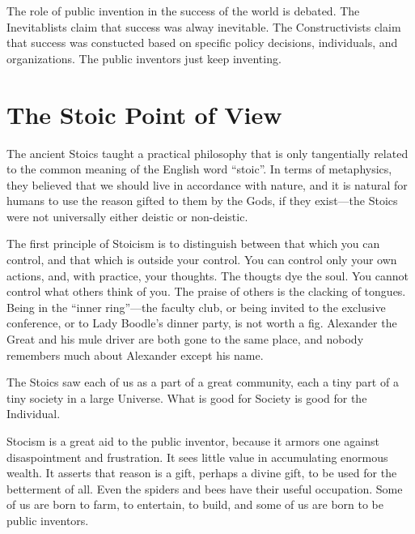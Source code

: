 \documentclass[
	fontsize=10pt, %
	twoside=false, %
	secnumdepth=1, %
]{kaobook}
\begin{document}
The role of public invention in the success of the world is
debated. The Inevitablists claim that success was alway inevitable.
The Constructivists claim that success was constucted based on
specific policy decisions, individuals, and organizations.
The public inventors just keep inventing.

\chapter{The Stoic Point of View}

The ancient Stoics taught a practical philosophy that is only
tangentially related to the common meaning of the English word ``stoic''.
In terms of metaphysics, they believed that we should live in
accordance with nature, and it is natural for humans to use the reason
gifted to them by the Gods, if they exist---the Stoics were not
universally either deistic or non-deistic.

The first principle of Stoicism
is to distinguish between that which you can control, and that which
is outside your control.  You can control only your own actions, and,
with practice, your thoughts. The thougts dye the soul.  You cannot
control what others think of you.  The praise of others is the clacking
of tongues.  Being in the ``inner ring''---the faculty club, or being
invited to the exclusive conference, or to Lady Boodle's dinner party,
is not worth a fig.
Alexander the Great and his mule driver are both gone to the same place,
and nobody remembers much about Alexander except his name.

The Stoics saw each of us as a part of a great community, each a
tiny part of a tiny society in a large Universe.
What is good for Society is good for the Individual.

Stocism is a great aid to the public inventor,
because it armors one against disaspointment and frustration.
It sees little value in accumulating enormous wealth.
It asserts that reason is a gift, perhaps a divine gift,
to be used for the betterment of all.
Even the spiders and bees have their useful occupation.
Some of us are born to farm, to entertain, to build, and
some of us are born to be public inventors.
\end{document}
